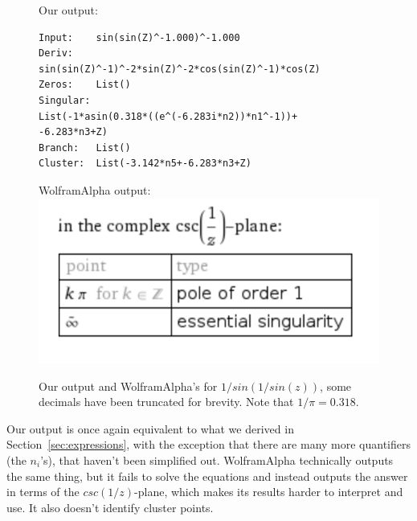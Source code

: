 \begin{figure}[H]
	\raggedright
	Our output: \\
	\begin{verbatim}
Input:    sin(sin(Z)^-1.000)^-1.000
Deriv:
sin(sin(Z)^-1)^-2*sin(Z)^-2*cos(sin(Z)^-1)*cos(Z)
Zeros:    List()
Singular:
List(-1*asin(0.318*((e^(-6.283i*n2))*n1^-1))+
-6.283*n3+Z)
Branch:   List()
Cluster:  List(-3.142*n5+-6.283*n3+Z)
	\end{verbatim} \vspace{7pt}
	WolframAlpha output:\\
	\includegraphics[width=0.6\columnwidth]{images/wpoles3}
	\caption{Our output and WolframAlpha's for $1/sin(1/sin(z))$, some decimals have been truncated for brevity. Note that $1/\pi=0.318.$}
	\label{fig:singEx3}
\end{figure}
Our output is once again equivalent to what we derived in Section~\ref{sec:expressions}, with the exception that there are many more quantifiers (the $n_i$'s), that haven't been simplified out. WolframAlpha technically outputs the same thing, but it fails to solve the equations and instead outputs the answer in terms of the $csc(1/z)$-plane, which makes its results harder to interpret and use. It also doesn't identify cluster points.

